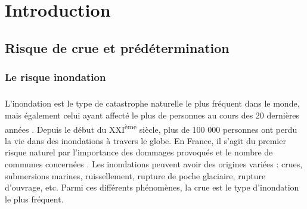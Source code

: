 %
%
%
%
%
%
%

\chapter{Introduction}
\label{chap:intro}
\newpage

\section{Risque de crue et prédétermination}


	\subsection{Le risque inondation}
	
	\paragraph{} L'inondation est le type de catastrophe naturelle le plus fréquent dans le monde, mais également celui ayant affecté le plus de personnes au cours des 20 dernières années \citep{undrr_human_2020}. Depuis le début du XXI\textsuperscript{ème} siècle, plus de 100 000 personnes ont perdu la vie dans des inondations à travers le globe. En France, il s'agit du premier risque naturel par l'importance des dommages provoqués et le nombre de communes concernées \citep{medd_prevention_2023}. Les inondations peuvent avoir des origines variées : crues, submersions marines, ruissellement, rupture de poche glaciaire, rupture d'ouvrage, etc. Parmi ces différents phénomènes, la crue est le type d'inondation le plus fréquent. 
	
